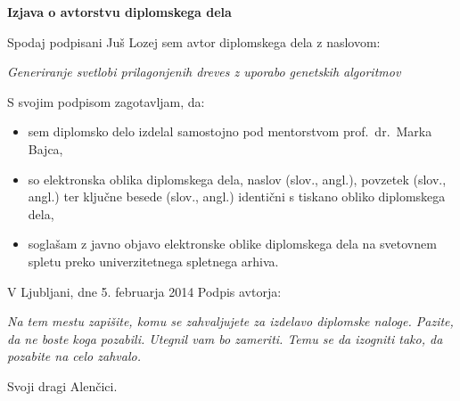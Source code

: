 \documentclass[a4paper, 12pt]{book}
\newcommand{\clearemptydoublepage}{\newpage{\pagestyle{empty}\cleardoublepage}}
\begin{document}
\vspace{2cm}

\clearemptydoublepage

\vspace*{1cm}
\begin{center}
{\Large \textbf{\sc Izjava o avtorstvu diplomskega dela}}
\end{center}

\vspace{1cm}
\noindent Spodaj podpisani Juš Lozej sem avtor  diplomskega dela z naslovom:

\vspace{0.5cm}
\emph{Generiranje svetlobi prilagonjenih dreves z uporabo genetskih algoritmov}

\vspace{1.5cm}
\noindent S svojim podpisom zagotavljam, da:
\begin{itemize}
	\item sem diplomsko delo izdelal samostojno pod mentorstvom
		prof.\ dr.\ Marka Bajca,

	\item	so elektronska oblika diplomskega dela, naslov (slov., angl.), povzetek (slov., angl.) ter ključne besede (slov., angl.) identični s tiskano obliko diplomskega dela,
	\item soglašam z javno objavo elektronske oblike diplomskega dela na svetovnem spletu preko univerzitetnega spletnega arhiva.	
\end{itemize}

\vspace{1cm}
\noindent V Ljubljani, dne 5. februarja 2014 \hfill Podpis avtorja:

\clearemptydoublepage

\thispagestyle{empty}\mbox{}\vfill\null\it%
Na tem mestu zapišite, komu se zahvaljujete za izdelavo diplomske naloge. Pazite, da ne boste koga pozabili. Utegnil vam bo zameriti. Temu se da izogniti tako, da pozabite na celo zahvalo.
\rm\normalfont

\clearemptydoublepage

\thispagestyle{empty}\mbox{}{\textheight}\mbox{}\hfill\begin{minipage}{0.55\textwidth}%
Svoji dragi Alenčici.
\normalfont\end{minipage}
\end{document}
